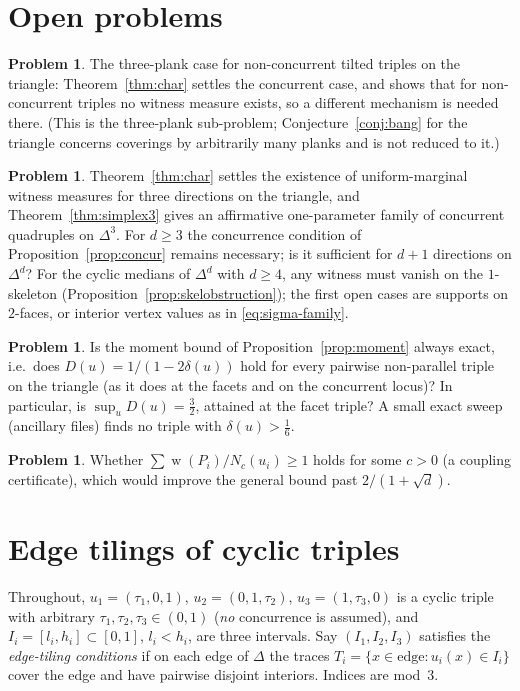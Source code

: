 \documentclass[11pt,reqno]{amsart}
\theoremstyle{plain}
\theoremstyle{definition}
\newtheorem{problem}[theorem]{Problem}
\theoremstyle{remark}
\DeclareMathOperator{\wid}{w}
\begin{document}
\section{Open problems}
\begin{problem}
The three-plank case for non-concurrent tilted triples on the triangle:
Theorem~\ref{thm:char} settles the concurrent case, and shows that for
non-concurrent triples no witness measure exists, so a different mechanism is
needed there. (This is the three-plank sub-problem; Conjecture~\ref{conj:bang}
for the triangle concerns coverings by arbitrarily many planks and is not
reduced to it.)
\end{problem}
\begin{problem}\label{prob:suff}
Theorem~\ref{thm:char} settles the existence of uniform-marginal witness
measures for three directions on the triangle, and Theorem~\ref{thm:simplex3}
gives an affirmative one-parameter family of concurrent quadruples on
$\Delta^3$. For $d\ge3$ the concurrence condition of
Proposition~\ref{prop:concur} remains necessary; is it sufficient for $d+1$
directions on $\Delta^d$? For the cyclic medians of $\Delta^d$ with $d\ge4$,
any witness must vanish on the $1$-skeleton
(Proposition~\ref{prop:skelobstruction}); the first open cases are supports on
$2$-faces, or interior vertex values as in \eqref{eq:sigma-family}.
\end{problem}
\begin{problem}\label{prob:defect}
Is the moment bound of Proposition~\ref{prop:moment} always exact, i.e.\ does
$D(u)=1/(1-2\delta(u))$ hold for every pairwise non-parallel triple on the
triangle (as it does at the facets and on the concurrent locus)? In particular,
is $\sup_uD(u)=\tfrac32$, attained at the facet triple? A small exact sweep
(ancillary files) finds no triple with $\delta(u)>\tfrac16$.
\end{problem}
\begin{problem}
Whether $\sum\wid(P_i)/N_c(u_i)\ge1$ holds for some $c>0$ (a coupling certificate),
which would improve the general bound past $2/(1+\sqrt d)$.
\end{problem}

\appendix
\section{Edge tilings of cyclic triples}\label{app:tilings}

Throughout, $u_1=(\tau_1,0,1)$, $u_2=(0,1,\tau_2)$, $u_3=(1,\tau_3,0)$ is a
cyclic triple with arbitrary $\tau_1,\tau_2,\tau_3\in(0,1)$ (\emph{no}
concurrence is assumed), and $I_i=[l_i,h_i]\subset[0,1]$, $l_i<h_i$, are three
intervals. Say $(I_1,I_2,I_3)$ satisfies the \emph{edge-tiling conditions} if on
each edge of $\Delta$ the traces $T_i=\{x\in\text{edge}: u_i(x)\in I_i\}$ cover
the edge and have pairwise disjoint interiors. Indices are mod~$3$.
\end{document}
